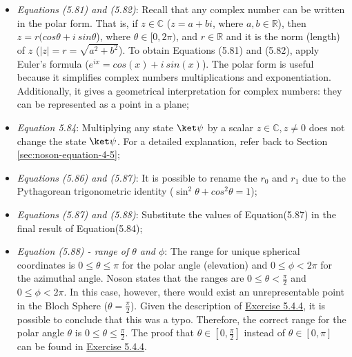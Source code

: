 \begin{itemize}
    \item \emph{Equations (5.81) and (5.82)}:
        Recall that any complex number can be written in the polar form.
        That is, if $z \in \mathbb{C}$ ($z = a + bi$, where $a, b \in \mathbb{R}$),
        then $z = r(cos\theta + i\ sin\theta$),
        where $\theta \in [0, 2\pi)$,
        and $r \in \mathbb{R}$ and it is the norm (length) of $z$
        ($|z| = r = \sqrt{a^2 + b^2}$).
        To obtain Equations (5.81) and (5.82), apply Euler's formula
        ($e^{ix} = cos(x) + i\ sin(x)$).
        The polar form is useful because it simplifies complex numbers multiplications and exponentiation.
        Additionally, it gives a geometrical interpretation for complex numbers:
        they can be represented as a point in a plane;
        
    \item \emph{Equation 5.84}:
        Multiplying any state $\ket \psi$ by a scalar
        $z \in \mathbb{C}, z \neq 0$ does not change the state $\ket \psi$.
        For a detailed explanation, refer back to Section \ref{sec:noson-equation-4-5};
        
    \item \emph{Equations (5.86) and (5.87)}:
        It is possible to rename the $r_0$ and $r_1$ due to the
        Pythagorean trigonometric identity ($\sin^2\theta + cos^2\theta = 1$);
    
    \item \emph{Equations (5.87) and (5.88)}:
        Substitute the values of Equation(5.87) in the
        final result of Equation(5.84);
        
    \item \emph{Equation (5.88) - range of $\theta$ and $\phi$}:
        The range for unique spherical coordinates is $0 \leq \theta \leq \pi$ for
        the polar angle (elevation) and $0 \leq \phi < 2\pi$ for the azimuthal angle.
        Noson states that the ranges are $0 \leq \theta < \frac \pi 2$ and $0 \leq \phi < 2\pi$.
        In this case, however, there would exist an unrepresentable point in the Bloch Sphere
        ($\theta = \frac \pi 2$).
        Given the description of \hyperref[sec:noson-exercise-5-4-4]{Exercise 5.4.4},
        it is possible to conclude that this was a typo.
        Therefore, the correct range for the polar angle $\theta$ is $0 \leq \theta \leq \frac \pi 2$.
        The proof that $\theta \in [0, \frac \pi 2]$ instead of $\theta \in [0, \pi]$ can be found in
        \hyperref[sec:noson-exercise-5-4-4]{Exercise 5.4.4}.
\end{itemize}

